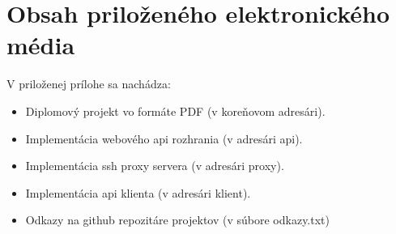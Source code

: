 \renewcommand\chaptername{Príloha}

\chapter{Obsah priloženého elektronického média}

\renewcommand*{\thepage}{B\arabic{page}}
\setcounter{page}{1}

V priloženej prílohe sa nachádza:

\begin{itemize}
    \item Diplomový projekt vo formáte PDF (v koreňovom adresári).
    \item Implementácia webového api rozhrania (v adresári api).
    \item Implementácia ssh proxy servera (v adresári proxy).
    \item Implementácia api klienta (v adresári klient).
    \item Odkazy na github repozitáre projektov (v súbore odkazy.txt)
\end{itemize}
